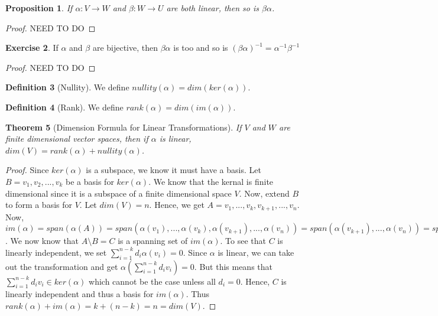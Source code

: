 \documentclass{tufte-handout}
\newtheorem{thm}{Theorem}
\newtheorem{prop}[thm]{Proposition}
\theoremstyle{definition}
\newtheorem{defn}[thm]{Definition}
\newtheorem{exer}[thm]{Exercise}
\theoremstyle{remark}
\begin{document}
\begin{prop}
If $\alpha: V \rightarrow W$ and $\beta: W \rightarrow U$ are both linear, then so is $\beta\alpha$. 
\end{prop}

\begin{proof}
    NEED TO DO
\end{proof}

\begin{exer}
If $\alpha$ and $\beta$ are bijective, then $\beta\alpha$ is too and so is $(\beta\alpha)^{-1} = \alpha^{-1}\beta^{-1}$
\end{exer}
\begin{proof}
    NEED TO DO
\end{proof}
\begin{defn}[Nullity]
We define $nullity(\alpha) = dim(ker(\alpha))$.
\end{defn}


\begin{defn}[Rank]
We define $rank(\alpha) = dim(im(\alpha))$.
\end{defn}



\begin{thm}[Dimension Formula for Linear Transformations]
If $V$ and $W$ are finite dimensional vector spaces, then if $\alpha$ is linear, $dim(V) = rank(\alpha) + nullity(\alpha)$.
\end{thm} 
\begin{proof}
Since $ker(\alpha)$ is a subspace, we know it must have a basis. Let $B = {v_1, v_2, ..., v_k}$ be a basis for $ker(\alpha)$. We know that the kernal is finite dimensional since it is a subspace of a finite dimensional space $V$. Now, extend $B$ to form a basis for $V$. Let $dim(V) = n$. Hence, we get $A = {v_1, ..., v_k, v_{k+1}, ..., v_n}$. Now, $im(\alpha) = span(\alpha(A)) = span(\alpha(v_1), ..., \alpha(v_k), \alpha(v_{k+1}), ..., \alpha(v_n)) = span(\alpha(v_{k+1}), ..., \alpha(v_n)) = span(A \setminus B)$. We now know that $A\setminus B = C$ is a spanning set of $im(\alpha)$. To see that $C$ is linearly independent, we set $\sum_{i=1}^{n-k} d_i\alpha(v_i) = 0$. Since $\alpha$ is linear, we can take out the transformation and get $\alpha(\sum_{i=1}^{n-k} d_iv_i) = 0$. But this means that $\sum_{i=1}^{n-k} d_iv_i \in ker(\alpha)$ which cannot be the case unless all $d_i = 0$. Hence, $C$ is linearly independent and thus a basis for $im(\alpha)$. Thus $rank(\alpha) + im(\alpha) = k + (n-k) = n = dim(V)$.
\end{proof}
\end{document}
